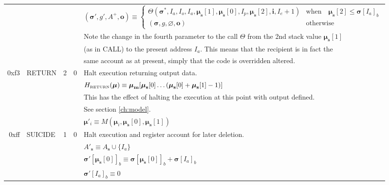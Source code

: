 \documentclass[9pt,oneside]{amsart}
\begin{document}
\begin{tabular*}{\columnwidth}[h]{rlrrl}
&&&& $(\boldsymbol{\sigma}', g', A^+, \mathbf{o}) \equiv \begin{cases}\Theta(\boldsymbol{\sigma}^*, I_a, I_o, I_a, \boldsymbol{\mu}_\mathbf{s}[1], \boldsymbol{\mu}_\mathbf{s}[0], I_p, \boldsymbol{\mu}_\mathbf{s}[2], \mathbf{i}, I_e + 1) & \text{when} \quad \boldsymbol{\mu}_\mathbf{s}[2] \leqslant \boldsymbol{\sigma}[I_a]_b \\ (\boldsymbol{\sigma}, g, \varnothing, \mathbf{o}) & \text{otherwise} \end{cases}$ \\
&&&& Note the change in the fourth parameter to the call $\Theta$ from the 2nd stack value $\boldsymbol{\mu}_\mathbf{s}[1]$\\
&&&& (as in {\small CALL}) to the present address $I_a$. This means that the recipient is in fact the\\
&&&& same account as at present, simply that the code is overridden altered.\\
\midrule
0xf3 & {\small RETURN} & 2 & 0 & Halt execution returning output data. \\
&&&& $H_{\text{\tiny RETURN}}(\boldsymbol{\mu}) \equiv \boldsymbol{\mu}_\mathbf{m}[ \boldsymbol{\mu}_\mathbf{s}[0] \dots ( \boldsymbol{\mu}_\mathbf{s}[0] + \boldsymbol{\mu}_\mathbf{s}[1] - 1 ) ]$ \\
&&&& This has the effect of halting the execution at this point with output defined.\\
&&&& See section \ref{ch:model}. \\
&&&& $\boldsymbol{\mu}'_i \equiv M(\boldsymbol{\mu}_i, \boldsymbol{\mu}_\mathbf{s}[0], \boldsymbol{\mu}_\mathbf{s}[1])$ \\
\midrule
0xff & {\small SUICIDE} & 1 & 0 & Halt execution and register account for later deletion. \\
&&&& $A'_\mathbf{s} \equiv A_\mathbf{s} \cup \{ I_a \}$ \\
&&&& $\boldsymbol{\sigma}'[\boldsymbol{\mu}_\mathbf{s}[0]]_b \equiv \boldsymbol{\sigma}[\boldsymbol{\mu}_\mathbf{s}[0]]_b + \boldsymbol{\sigma}[I_a]_b$ \\
&&&& $\boldsymbol{\sigma}'[I_a]_b \equiv 0$ \\\bottomrule
\end{tabular*}

\end{document}
